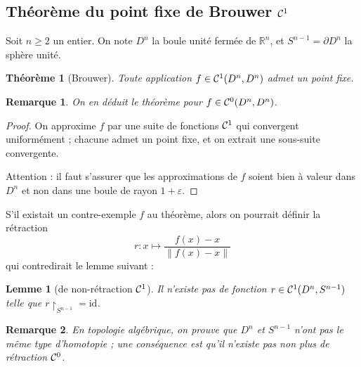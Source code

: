 \documentclass[a4paper, 11pt]{article}
\def\R{\mathbb{R}}
\def\Cf{{\cal{C}}}
\newtheorem*{theorem}{Théorème}
\newtheorem*{lemma}{Lemme}
\newtheorem*{remark}{Remarque}
\begin{document}
\newpage

\subsection{Théorème du point fixe de Brouwer $\Cf^1$}

Soit $n \geq 2$ un entier. On note $D^n$ la boule unité fermée de $\R^n$, et
$S^{n-1} = \partial D^n$ la sphère unité.

\begin{theorem}[Brouwer]
  Toute application $f \in \Cf^1(D^n, D^n)$ admet un point fixe.
\end{theorem}

\begin{remark}
  On en déduit le théorème pour $f \in \Cf^0(D^n, D^n)$.
\end{remark}
\begin{proof}
  On approxime $f$ par une suite de fonctions $\Cf^1$ qui convergent
  uniformément ; chacune admet un point fixe, et on extrait une sous-suite
  convergente.

  Attention : il faut s'assurer que les approximations de $f$ soient bien à
  valeur dans $D^n$ et non dans une boule de rayon $1+\varepsilon$.
\end{proof}

S'il existait un contre-exemple $f$ au théorème, alors on pourrait définir la
rétraction
\[ r : x \mapsto \frac{f(x) - x}{\|f(x) - x\|}\]
qui contredirait le lemme suivant :

\begin{lemma}[de non-rétraction $\Cf^1$]
  Il n'existe pas de fonction $r \in \Cf^1(D^n, S^{n-1})$ telle que
  $r\restriction_{S^{n-1}} = \mathrm{id}$.
\end{lemma}
\begin{remark}
En topologie algébrique, on prouve que $D^n$ et $S^{n-1}$ n'ont pas le même type
d'homotopie ; une conséquence est qu'il n'existe pas non plus de rétraction
$\Cf^0$.
\end{remark}
\end{document}
